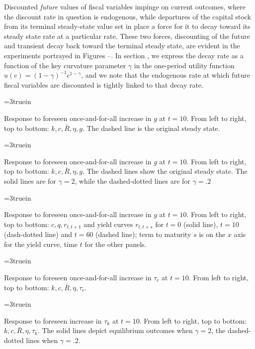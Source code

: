 Discounted {\it future\/}  values of fiscal variables impinge on current outcomes, where the
 discount rate in question is endogenous, while departures of the capital stock from its terminal
 steady-state value set in place a force for it to decay toward its
steady state rate at a particular rate.
 These two forces, discounting of the future and transient decay back toward the terminal steady
 state, are evident in the experiments portrayed in Figures --.
 In section ,
  we express the decay rate as a function of the key curvature parameter
 $\gamma$ in the one-period utility function $u(c)=(1-\gamma)^{-1}c^{1-\gamma}$, and we note that
 the endogenous rate at which future fiscal variables are discounted is tightly linked to that decay
 rate.



\centerline{\epsfxsize=3truein}
\caption{Response to foreseen once-and-for-all increase in $g$ at $t=10$.
From left to right, top to bottom: $k, c, \bar R, \eta, g$. The dashed line is the original
steady state.}
\endfigure


\centerline{\epsfxsize=3truein}
\caption{Response to foreseen once-and-for-all increase in $g$ at $t=10$.
From left to right, top to bottom: $k, c, \bar R, \eta, g$. The dashed lines show the original
steady state. The solid lines  are for $\gamma=2$, while the dashed-dotted lines are for $\gamma=.2$}
\endfigure


\centerline{\epsfxsize=3truein}
\caption{Response to foreseen once-and-for-all increase in $g$ at $t=10$.
From left to right, top to bottom: $c, q, r_{t,t+1}$ and yield curves $r_{t, t+s}$  for $t=0$ (solid line),
$t=10$ (dash-dotted line) and $t=60$ (dashed line); term to maturity $s$ is on the $x$ axis for the yield curve, time $t$
for the other panels.}
\endfigure
%
\centerline{\epsfxsize=3truein}
\caption{Response to foreseen once-and-for-all  increase in $\tau_c$ at
$t=10$. From left to right, top to bottom: $k, c, \bar R, \eta, \tau_c$.}
\endfigure



\centerline{\epsfxsize=3truein}
\caption{Response to foreseen increase in $\tau_k$ at $t=10$.  From left to
right, top to bottom: $k, c, \bar R, \eta, \tau_k$. The solid lines depict equilibrium outcomes when $\gamma=2$,
the dashed-dotted lines when $\gamma = .2$.  }
\endfigure

